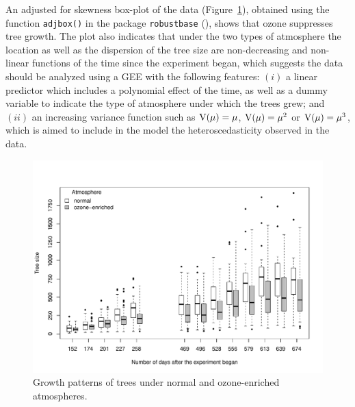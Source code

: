 An adjusted for skewness box-plot of the data (Figure~\ref{spruces0}), obtained using the function {\tt adjbox()} in the package {\tt robustbase} (\cite{MRCTR22}), shows that ozone suppresses tree growth. The plot also indicates that under the two types of atmosphere the location as well as the dispersion of the tree size are non-decreasing and non-linear functions of the time since the experiment began, which suggests the data should be analyzed using a GEE with the following features: $(i)$ a linear predictor which includes a polynomial effect of the time, as well as a dummy variable to indicate the type of atmosphere under which the trees grew; and $(ii)$ an increasing variance function such as ${\rm V}(\mu) = \mu$, ${\rm V}(\mu) = \mu^2$ or ${\rm V}(\mu) = \mu^3$, which is aimed to include in the model the heteroscedasticity observed in the data.\\

\begin{figure}[h!]
\centering
\includegraphics[width=\textwidth]{spruces}
\caption{Growth patterns of trees under normal and ozone-enriched atmospheres.}
\label{spruces0}
\end{figure}


